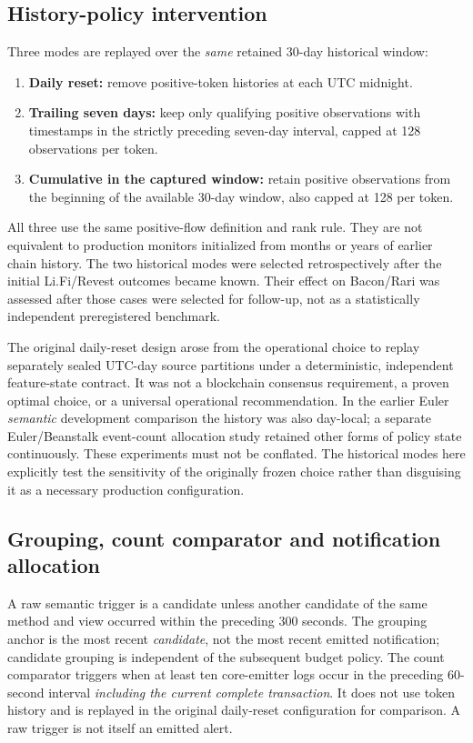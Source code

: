 \documentclass[preprint,12pt,authoryear]{elsarticle}
\begin{document}
\subsection{History-policy intervention}
Three modes are replayed over the \emph{same} retained 30-day historical window:
\begin{enumerate}
\item \textbf{Daily reset:} remove positive-token histories at each UTC midnight.
\item \textbf{Trailing seven days:} keep only qualifying positive observations with timestamps in the strictly preceding seven-day interval, capped at 128 observations per token.
\item \textbf{Cumulative in the captured window:} retain positive observations from the beginning of the available 30-day window, also capped at 128 per token.
\end{enumerate}
All three use the same positive-flow definition and rank rule. They are not equivalent to production monitors initialized from months or years of earlier chain history. The two historical modes were selected retrospectively after the initial Li.Fi/Revest outcomes became known. Their effect on Bacon/Rari was assessed after those cases were selected for follow-up, not as a statistically independent preregistered benchmark.

The original daily-reset design arose from the operational choice to replay separately sealed UTC-day source partitions under a deterministic, independent feature-state contract. It was not a blockchain consensus requirement, a proven optimal choice, or a universal operational recommendation. In the earlier Euler \emph{semantic} development comparison the history was also day-local; a separate Euler/Beanstalk event-count allocation study retained other forms of policy state continuously. These experiments must not be conflated. The historical modes here explicitly test the sensitivity of the originally frozen choice rather than disguising it as a necessary production configuration.

\subsection{Grouping, count comparator and notification allocation}
A raw semantic trigger is a candidate unless another candidate of the same method and view occurred within the preceding 300 seconds. The grouping anchor is the most recent \emph{candidate}, not the most recent emitted notification; candidate grouping is independent of the subsequent budget policy. The count comparator triggers when at least ten core-emitter logs occur in the preceding 60-second interval \emph{including the current complete transaction}. It does not use token history and is replayed in the original daily-reset configuration for comparison. A raw trigger is not itself an emitted alert.
\end{document}
